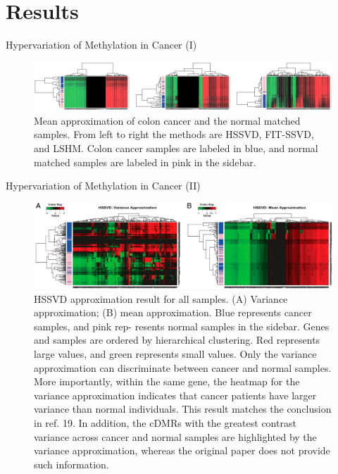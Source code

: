 \documentclass{beamer}
\begin{document}
\section{Results}

\begin{frame}{Hypervariation of Methylation in Cancer (I)}
  \begin{figure}
    \includegraphics[width=\linewidth]{figures/fig2.png}
    \caption{Mean approximation of colon cancer and the normal matched samples.
      From left to right the methods are HSSVD, FIT-SSVD, and LSHM\@. Colon
      cancer samples are labeled in blue, and normal matched samples are labeled
      in pink in the sidebar.}
  \end{figure}
\end{frame}

\begin{frame}{Hypervariation of Methylation in Cancer (II)}
  \begin{figure}
    \includegraphics[width=\linewidth]{figures/fig3.png}
    \caption{HSSVD approximation result for all samples. (A) Variance
      approximation; (B) mean approximation. Blue represents cancer samples,
      and pink rep- resents normal samples in the sidebar. Genes and samples
      are ordered by hierarchical clustering. Red represents large values, and
      green represents small values. Only the variance approximation can
      discriminate between cancer and normal samples. More importantly, within
      the same gene, the heatmap for the variance approximation indicates that
      cancer patients have larger variance than normal individuals. This result
      matches the conclusion in ref. 19. In addition, the cDMRs with the
      greatest contrast variance across cancer and normal samples are
      highlighted by the variance approximation, whereas the original paper
      does not provide such information.}
  \end{figure}
\end{frame}
\end{document}

